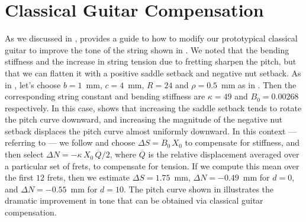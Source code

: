 %
%
%

 \section{Classical Guitar Compensation\label{sct:comp}}

As we discussed in ,  provides a guide to how to modify our prototypical classical guitar to improve the tone of the string shown in . We noted that the bending stiffness and the increase in string tension due to fretting sharpen the pitch, but that we can flatten it with a positive saddle setback and negative nut setback. As in , let's choose $b = 1$~mm, $c = 4$~mm, $R = 24$ and $\rho = 0.5$~mm as in . Then the corresponding string constant and bending stiffness are $\kappa = 49$ and $B_0 = 0.00268$ respectively. In this case,  shows that increasing the saddle setback tends to rotate the pitch curve downward, and increasing the magnitude of the negative nut setback displaces the pitch curve almost uniformly downward. In this context --- referring to  --- we follow  and choose $\Delta S = B_0\, X_0$ to compensate for stiffness, and then select $\Delta N = - \kappa\, X_0\, \overline{Q} / 2$, where $\overline{Q}$ is the relative displacement averaged over a particular set of frets, to compensate for tension. If we compute this mean over the first $12$ frets, then we estimate $\Delta S = 1.75$~mm, $\Delta N = -0.49$~mm for $d = 0$, and $\Delta N = -0.55$~mm for $d = 10$. The pitch curve shown in  illustrates the dramatic improvement in tone that can be obtained via classical guitar compensation.

